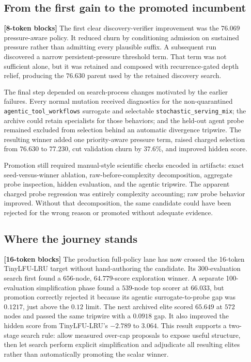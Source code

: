 \documentclass[11pt]{article}
\newcommand{\identifier}[1]{\nolinkurl{#1}}
\newcommand{\blocktag}[1]{\textbf{\color{navy}[#1-token blocks]}}
\begin{document}
\subsection{From the first gain to the promoted incumbent}

\blocktag{8} The first clear discovery-verifier improvement was the \(76.069\)
pressure-aware policy.
It reduced churn by conditioning admission on sustained pressure rather than admitting
every plausible suffix.  A subsequent run discovered a narrow persistent-pressure
threshold term.  That term was not sufficient alone, but it was retained and composed
with recurrence-gated depth relief, producing the \(76.630\) parent used by the
retained discovery search.

The final step depended on search-process changes motivated by the earlier failures.
Every normal mutation received diagnostics for the non-quarantined
\identifier{agentic_tool_workflows} surrogate and selectable
\identifier{stochastic_serving_mix}; the archive could retain specialists for those
behaviors; and the held-out agent probe remained excluded from selection behind an
automatic divergence tripwire.  The resulting winner added one priority-aware
pressure term, raised charged selection from \(76.630\) to \(77.230\), cut validation
churn by \(37.6\%\), and improved hidden score.

Promotion still required manual-style scientific checks encoded in artifacts: exact
seed-versus-winner ablation, raw-before-complexity decomposition, aggregate probe
inspection, hidden evaluation, and the agentic tripwire.  The apparent charged probe
regression was entirely complexity accounting; raw probe behavior improved.  Without
that decomposition, the same candidate could have been rejected for the wrong reason
or promoted without adequate evidence.

\subsection{Where the journey stands}

\blocktag{16} The production full-policy lane has now crossed the 16-token TinyLFU-LRU
target without hand-authoring the candidate.  Its 300-evaluation search first found a \(656\)-node,
\(64.779\)-score exploration winner.  A separate 100-evaluation simplification phase
found a \(539\)-node top scorer at \(66.033\), but promotion correctly rejected it
because its agentic surrogate-to-probe gap was \(0.1217\), just above the \(0.12\)
limit.  The next archived elite scored \(65.649\) at \(572\) nodes and passed the same
tripwire with a \(0.0918\) gap.  It also improved the hidden score from
TinyLFU-LRU's \(-2.789\) to \(3.064\).  This result supports a two-stage search rule:
allow measured over-cap proposals to expose useful structure, then let search perform
explicit simplification and adjudicate all resulting elites rather than automatically
promoting the scalar winner.
\end{document}
